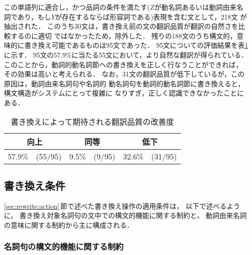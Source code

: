 この単語列に適合し，かつ品詞の条件を満たす($Z$が動名詞あるいは動詞由来名
詞であり，もし$Y$が存在するならば形容詞である)表現を含む文として，218文
が抽出された．
このうち30文は，書き換え前の文の翻訳品質が翻訳の自然さを比較するのに適切
ではなかったため，除外した．
残りの188文のうち構文的，意味的に書き換え可能であるものは95文であった．
95文についての評価結果を表\ref{tab:prospect}\,に示す．
95文の57.9\%に当たる55文において，より自然な翻訳が得られている．
このことから，動詞的動名詞節への書き換えを正しく行なうことができれば，
その効果は高いと考えられる．
なお，31文の翻訳品質が低下しているが，この原因は，動詞由来名詞句や名詞的
動名詞句を動詞的動名詞節に書き換えると，構文構造がシステムにとって複雑に
なりすぎ，正しく認識できなかったことにある．
\begin{table}[htbp]
\caption{書き換えによって期待される翻訳品質の改善度}
\label{tab:prospect}
\begin{center}
\begin{tabular}{|r@{}r|r@{}r|r@{}r|} \hline
\multicolumn{2}{|c}{向上} & \multicolumn{2}{|c}{同等} & 
\multicolumn{2}{|c|}{低下} \\\hline\hline
57.9\% & (55/95) &  9.5\% & (9/95) &  32.6\% & (31/95) \\\hline
\end{tabular}
\end{center}
\end{table}

\subsection{書き換え条件}
\label{sec:rewrite:cond}

\ref{sec:rewrite:action}\,節で述べた書き換え操作の適用条件は，
以下で述べるように，
書き換え対象名詞句の文中での構文的機能に関する制約と， 
動詞由来名詞の意味に関する制約から主に構成される．

\subsubsection{名詞句の構文的機能に関する制約}
\label{sec:rewrite:cond:syn}

